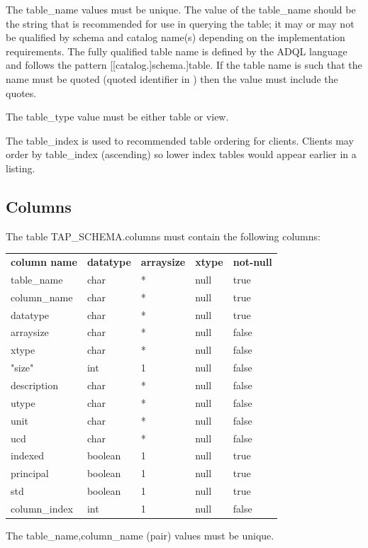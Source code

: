\documentclass[11pt,letter]{ivoa}
\begin{document}
The table\_name values must be unique. The value of the 
table\_name should be the string that is recommended for use in 
querying the table; it may or may not be qualified by schema and catalog name(s) 
depending on the implementation requirements. The fully qualified table name is 
defined by the ADQL language and follows the pattern [[catalog.]schema.]table. 
If the table name is such that the name must be quoted (quoted identifier in 
\citep{std:ADQL}) then the value must include the quotes.

The table\_type value must be either table or view.

The table\_index is used to recommended table ordering for clients. Clients 
may order by table\_index (ascending) so lower index tables would appear 
earlier in a listing.

\subsection{Columns}
\label{sec:tap-schema-columns}
The table TAP\_SCHEMA.columns must contain the following columns:

\begin{tabular}{l l l l l}
\label{tab:tap-schema-columns}
\textbf{column name} & \textbf{datatype} & \textbf{arraysize} & \textbf{xtype} & \textbf{not-null} \\
table\_name & char & * & null & true \\
column\_name & char & * & null & true \\
datatype & char & * & null & true \\
arraysize & char & * & null & false \\
xtype & char & * & null & false \\
"size" & int & 1 & null & false \\
description & char & * & null & false \\
utype & char & * & null & false \\
unit & char & * & null & false \\
ucd & char & * & null & false \\
indexed & boolean & 1 & null & true \\
principal & boolean & 1 & null & true \\
std & boolean & 1 & null & true \\
column\_index & int & 1 & null & false \\
\end{tabular}

The table\_name,column\_name (pair) values must be 
unique.
\end{document}
